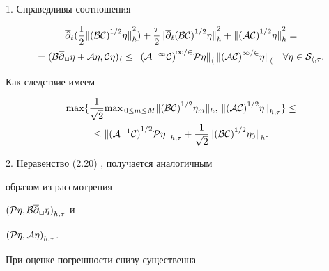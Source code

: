 




\begin{pf} 1. Справедливы соотношения


\begin{gather*}


\overline{\partial}_t( \frac12 {\ver{(\cal B\cal C)}^{1/2}\eta\ver}_h^2)+


\frac{\tau}{2}{\ver\overline{\partial}_t{(\cal B\cal C)}^{1/2}\eta\ver}_h^2+


{\ver{(\cal A\cal C)}^{1/2}\eta\ver}_{h}^2= \\


%


=(\cal B\overline\partial_t\eta+\cal A\eta,\cal C\eta)_h\le


{\ver{({\cal A}^{-1}\cal C)}^{1/2}\cal P\eta \ver}_h\,


{\ver{(\cal A\cal C)}^{1/2}\eta\ver}_{h} \quad\forall\eta\in S_{h,\tau}.


\end{gather*}


Как следствие имеем


\begin{gather*}


\max\{ \frac{1}{\sqrt 2}\ma {(\cal B\cal C)}^{1/2}\eta_m\ver_h,\,


{\ver{(\cal A\cal C)}^{1/2}\eta\ver}_{h,\tau}\}\le \\


%


\le {\ver{({\cal A}^{-1}\cal C)}^{1/2}\cal P\eta\ver}_{h,\tau}


+\frac{1}{\sqrt 2}{\ver{(\cal B\cal C)}^{1/2}\eta_0\ver}_h.


\end{gather*}





2. Неравенство (2.20) \cite{Z7}, \cite{Za} получается аналогичным


образом из рассмотрения


${(\cal P\eta,\cal B\overline\partial_t\eta)}_{h,\tau}$ и


${(\cal P\eta,\cal A\eta)}_{h,\tau}$. 


\end{pf}





При оценке погрешности снизу существенна





